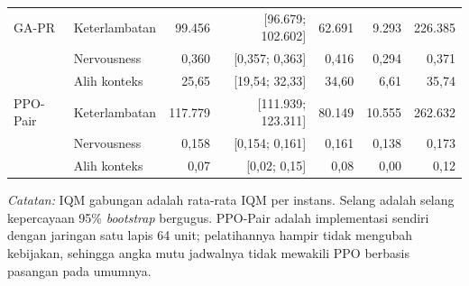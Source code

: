 \begin{table}[htbp]
\begin{tabular}{llrrrrr}
\addlinespace
GA-PR & Keterlambatan & 99.456 & [96.679; 102.602] & 62.691 & 9.293 & 226.385 \\
 & Nervousness & 0,360 & [0,357; 0,363] & 0,416 & 0,294 & 0,371 \\
 & Alih konteks & 25,65 & [19,54; 32,33] & 34,60 & 6,61 & 35,74 \\
\addlinespace
PPO-Pair & Keterlambatan & 117.779 & [111.939; 123.311] & 80.149 & 10.555 & 262.632 \\
 & Nervousness & 0,158 & [0,154; 0,161] & 0,161 & 0,138 & 0,173 \\
 & Alih konteks & 0,07 & [0,02; 0,15] & 0,08 & 0,00 & 0,12 \\
\bottomrule
\end{tabular}
\par\smallskip\footnotesize\textit{Catatan:} IQM gabungan adalah rata-rata IQM per instans. Selang adalah selang kepercayaan 95\% \emph{bootstrap} bergugus. PPO-Pair adalah implementasi sendiri dengan jaringan satu lapis 64 unit; pelatihannya hampir tidak mengubah kebijakan, sehingga angka mutu jadwalnya tidak mewakili PPO berbasis pasangan pada umumnya.
\end{table}
